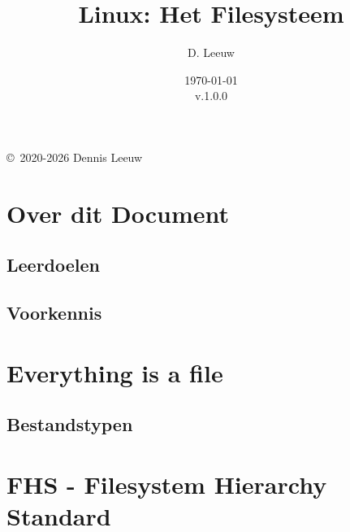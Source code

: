 \documentclass[a4paper,12pt,twoside,openright,titlepage]{book}
\author{D. Leeuw}
\title{Linux: Het Filesysteem}
\date{\today\\v.1.0.0}
\begin{document}

\maketitle

\copyright\ 2020-2026 Dennis Leeuw\\




\frontmatter
\chapter{Over dit Document}
\section{Leerdoelen}

\section{Voorkennis}

%
%

\tableofcontents

\mainmatter

\chapter{Everything is a file}

\section{Bestandstypen}

\chapter{FHS - Filesystem Hierarchy Standard}


\backmatter
\printindex
\end{document}
